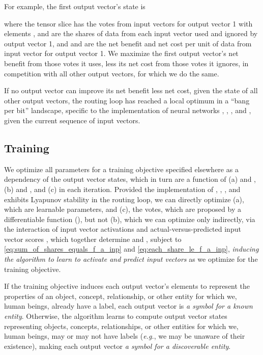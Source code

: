 \documentclass[11pt,a4paper]{article}
\begin{document}
For example, the first output vector's state is



where the tensor slice  has the votes from input vectors  for output vector 1 with elements ,  and  are the shares of data from each input vector  used and ignored by output vector 1, and  and  are the net benefit and net cost per unit of data from input vector  for output vector 1. We maximize the first output vector's net benefit from those votes it uses, less its net cost from those votes it ignores, in competition with all other output vectors, for which we do the same.

If no output vector can improve its net benefit less net cost, given the state of all other output vectors, the routing loop has reached a local optimum in a ``bang per bit'' landscape, specific to the implementation of neural networks , , , and , given the current sequence of input vectors.

\subsection{Training}\label{ssec:training}

We optimize all parameters for a training objective specified elsewhere as a dependency of the output vector states, which in turn are a function of (a)  and , (b)  and , and (c)  in each iteration. Provided the implementation of , , , and  exhibits Lyapunov stability in the routing loop, we can directly optimize (a), which are learnable parameters, and (c), the votes, which are proposed by a differentiable function (), but not (b), which we can optimize only indirectly, via the interaction of input vector activations  and actual-versus-predicted input vector scores , which together determine  and , subject to  \eqref{eq:sum_of_shares_equals_f_a_inp} and \eqref{eq:each_share_le_f_a_inp}, {\em inducing the algorithm to learn to activate and predict input vectors} as we optimize for the training objective.

If the training objective induces each output vector's elements to represent the properties of an object, concept, relationship, or other entity for which we, human beings, already have a label, each output vector is {\em a symbol for a known entity}. Otherwise, the algorithm learns to compute output vector states representing objects, concepts, relationships, or other entities for which we, human beings, may or may not have labels ({\em e.g.}, we may be unaware of their existence), making each output vector {\em a symbol for a discoverable entity}.
\end{document}
